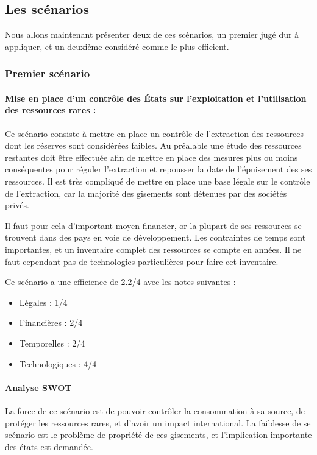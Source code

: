 \subsection{Les scénarios}

\smallbreak Nous allons maintenant présenter deux de ces scénarios, un premier jugé dur à appliquer, et un deuxième considéré comme le plus efficient.

\subsubsection{Premier scénario}    

\paragraph{Mise en place d’un contrôle des États sur l’exploitation et l’utilisation des ressources rares :}
\medbreak
Ce scénario consiste à mettre en place un contrôle de l’extraction des ressources dont les réserves sont considérées faibles. Au préalable une étude des ressources restantes doit être effectuée afin de mettre en place des mesures plus ou moins conséquentes pour réguler l’extraction et repousser la date de l’épuisement des ses ressources.
Il est très compliqué de mettre en place une base légale sur le contrôle de l’extraction, car la majorité des gisements sont détenues par des sociétés privés. 

Il faut pour cela d’important moyen financier, or la plupart de ses ressources se trouvent dans des pays en voie de développement.
Les contraintes de temps sont importantes, et un inventaire complet des ressources se compte en années. 
Il ne faut cependant pas de technologies particulières pour faire cet inventaire.

Ce scénario a une efficience de 2.2/4 avec les notes suivantes :
\begin{itemize}
\item Légales : 1/4
\item Financières : 2/4
\item Temporelles : 2/4
\item Technologiques : 4/4
\end{itemize}


\paragraph{Analyse SWOT}

La force de ce scénario est de pouvoir contrôler la consommation à sa source, de protéger les ressources rares, et d’avoir un impact international.
La faiblesse de se scénario est le problème de propriété de ces gisements, et l’implication importante des états est demandée. 

